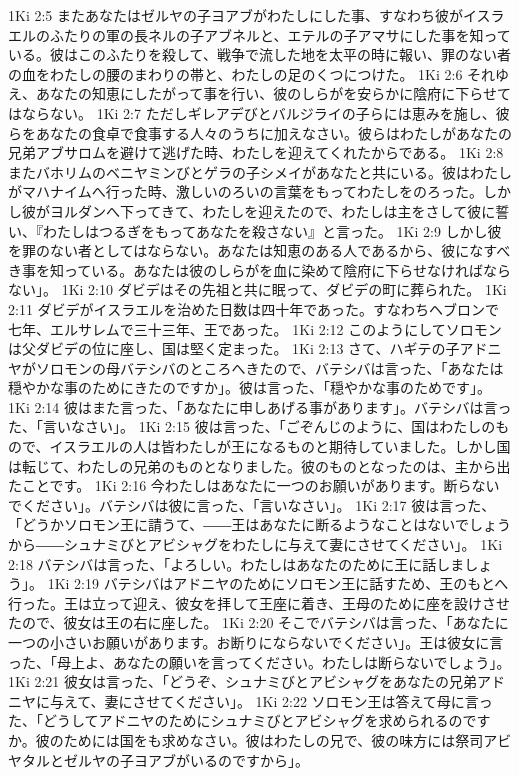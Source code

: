 1Ki 2:5  またあなたはゼルヤの子ヨアブがわたしにした事、すなわち彼がイスラエルのふたりの軍の長ネルの子アブネルと、エテルの子アマサにした事を知っている。彼はこのふたりを殺して、戦争で流した地を太平の時に報い、罪のない者の血をわたしの腰のまわりの帯と、わたしの足のくつにつけた。
1Ki 2:6  それゆえ、あなたの知恵にしたがって事を行い、彼のしらがを安らかに陰府に下らせてはならない。
1Ki 2:7  ただしギレアデびとバルジライの子らには恵みを施し、彼らをあなたの食卓で食事する人々のうちに加えなさい。彼らはわたしがあなたの兄弟アブサロムを避けて逃げた時、わたしを迎えてくれたからである。
1Ki 2:8  またバホリムのベニヤミンびとゲラの子シメイがあなたと共にいる。彼はわたしがマハナイムへ行った時、激しいのろいの言葉をもってわたしをのろった。しかし彼がヨルダンへ下ってきて、わたしを迎えたので、わたしは主をさして彼に誓い、『わたしはつるぎをもってあなたを殺さない』と言った。
1Ki 2:9  しかし彼を罪のない者としてはならない。あなたは知恵のある人であるから、彼になすべき事を知っている。あなたは彼のしらがを血に染めて陰府に下らせなければならない」。
1Ki 2:10  ダビデはその先祖と共に眠って、ダビデの町に葬られた。
1Ki 2:11  ダビデがイスラエルを治めた日数は四十年であった。すなわちヘブロンで七年、エルサレムで三十三年、王であった。
1Ki 2:12  このようにしてソロモンは父ダビデの位に座し、国は堅く定まった。
1Ki 2:13  さて、ハギテの子アドニヤがソロモンの母バテシバのところへきたので、バテシバは言った、「あなたは穏やかな事のためにきたのですか」。彼は言った、「穏やかな事のためです」。
1Ki 2:14  彼はまた言った、「あなたに申しあげる事があります」。バテシバは言った、「言いなさい」。
1Ki 2:15  彼は言った、「ごぞんじのように、国はわたしのもので、イスラエルの人は皆わたしが王になるものと期待していました。しかし国は転じて、わたしの兄弟のものとなりました。彼のものとなったのは、主から出たことです。
1Ki 2:16  今わたしはあなたに一つのお願いがあります。断らないでください」。バテシバは彼に言った、「言いなさい」。
1Ki 2:17  彼は言った、「どうかソロモン王に請うて、――王はあなたに断るようなことはないでしょうから――シュナミびとアビシャグをわたしに与えて妻にさせてください」。
1Ki 2:18  バテシバは言った、「よろしい。わたしはあなたのために王に話しましょう」。
1Ki 2:19  バテシバはアドニヤのためにソロモン王に話すため、王のもとへ行った。王は立って迎え、彼女を拝して王座に着き、王母のために座を設けさせたので、彼女は王の右に座した。
1Ki 2:20  そこでバテシバは言った、「あなたに一つの小さいお願いがあります。お断りにならないでください」。王は彼女に言った、「母上よ、あなたの願いを言ってください。わたしは断らないでしょう」。
1Ki 2:21  彼女は言った、「どうぞ、シュナミびとアビシャグをあなたの兄弟アドニヤに与えて、妻にさせてください」。
1Ki 2:22  ソロモン王は答えて母に言った、「どうしてアドニヤのためにシュナミびとアビシャグを求められるのですか。彼のためには国をも求めなさい。彼はわたしの兄で、彼の味方には祭司アビヤタルとゼルヤの子ヨアブがいるのですから」。
